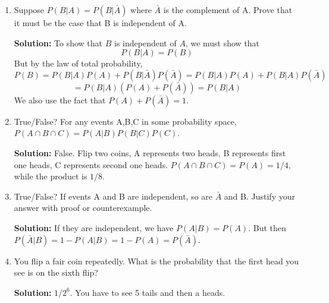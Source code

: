 \documentclass{article}
\newenvironment{solution}{

            \color{blue} \smallskip \textbf{Solution:}}{}
\begin{document}
\begin{enumerate}
\begin{enumerate}
\begin{solution}
                But $P(C \cap B) = P(C \cap B|A) P(A) + P(C \cap B | \bar{A}) P(\bar{A})$. It's impossible to die from cancer if you don't havec it, so then
                $P(C \cap B) = P(C \cap B|A) \cdot 0.1 = 0.9 * 0.2 * 0.1 = 0.0018$. Since $P(B) = 0.18$, we end up with $p \geq 0.01$ to be when we should not take surgery.
                This may defy your intuition, but remember that there's a half probability that someone doesn't have cancer even if the test says they do, and that in that case
                it's not worth to add risk of surgery.
            \end{solution}
        \end{enumerate}
        \item Suppose $P(B|A) = P(B|\bar{A})$ where $\bar{A}$ is the complement of A. Prove that it must be the case that B is independent of A.
        \begin{solution}
            To show that $B$ is independent of $A$, we must show that \[
                P(B|A) = P(B)
            \]
            But by the law of total probability, \[
                P(B) = P(B|A) P(A) + P(B|\bar{A}) P(\bar{A}) = P(B|A) P(A) + P(B|A) P(\bar{A})
            \] \[
            = P(B|A) (P(A) + P(\bar{A})) = P(B|A)
            \]
            We also use the fact that $P(A) + P(\bar{A}) = 1$.
        \end{solution}
        \item True/False? For any events A,B,C in some probability space, $P(A \cap B \cap C) = P(A|B)P(B|C)P(C)$.
        \begin{solution}
            False. Flip two coins, A represents two heads, B represents first one heads, C represents second one heads. $P(A \cap B \cap C) = P(A) = 1/4$, while
            the product is $1/8$.
        \end{solution}
        \item True/False? If events A and B are independent, so are $\bar{A}$ and B. Justify your answer with proof or counterexample.
        \begin{solution}
            If they are independent, we have $P(A|B) = P(A)$. But then $P(\bar{A}|B) = 1 - P(A|B) = 1 - P(A) = P(\bar{A})$.
        \end{solution}
        \item You flip a fair coin repeatedly. What is the probability that the first head you see is on the sixth flip?
        \begin{solution}
            $1/{2^6}$. You have to see 5 tails and then a heads.

\end{solution}
\end{enumerate}
\end{document}
